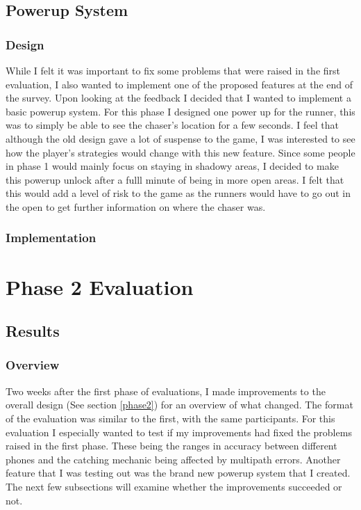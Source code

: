 \documentclass{l4proj}
\begin{document}
\section{Powerup System}

\subsection{Design}
While I felt it was important to fix some problems that were raised in the first evaluation, I also
wanted to implement one of the proposed features at the end of the survey. Upon looking at the feedback
I decided that I wanted to implement a basic powerup system. For this phase I designed one power up for
the runner, this was to simply be able to see the chaser's location for a few seconds. I feel that although
the old design gave a lot of suspense to the game, I was interested to see how the player's strategies
would change with this new feature. Since some people in phase 1 would mainly focus on staying in shadowy
areas, I decided to make this powerup unlock after a fulll minute of being in more open areas. I felt that
this would add a level of risk to the game as the runners would have to go out in the open to get further
information on where the chaser was.

\subsection{Implementation}

\chapter{Phase 2 Evaluation}

\section{Results}
\subsection{Overview}
Two weeks after the first phase of evaluations, I made improvements to the overall design (See section \ref{phase2}) for an overview
of what changed. The format of the evaluation was similar to the first, with the same participants. For this evaluation I especially
wanted to test if my improvements had fixed the problems raised in the first phase. These being the ranges in accuracy between different
phones and the catching mechanic being affected by multipath errors. Another feature that I was testing out was the brand new powerup
system that I created. The next few subsections will examine whether the improvements succeeded or not.
\end{document}

